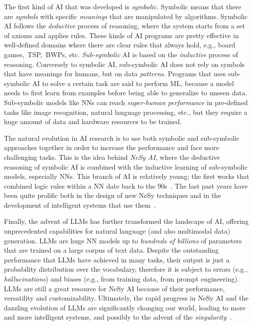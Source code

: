 \begin{refsection}
The first kind of \ac{AI} that was developed is \emph{symbolic}.
%
Symbolic means that there are \emph{symbols} with specific \emph{meanings} that are manipulated by algorithms.
%
Symbolic \ac{AI} follows the \emph{deductive} process of reasoning, where the system starts from a set of axioms and applies rules.
%
These kinds of \ac{AI} programs are pretty effective in well-defined domains where there are clear rules that always hold, e.g., board games,~\ac{TSP},~\acp{BWP}, etc.
%
\emph{Sub-symbolic} \ac{AI} is based on the \emph{inductive} process of reasoning.
%
Conversely to symbolic \ac{AI}, sub-symbolic \ac{AI} does not rely on symbols that have meanings for humans, but on data \emph{patterns}.
%
Programs that uses sub-symbolic \ac{AI} to solve a certain task are said to perform \ac{ML}, because a model needs to first learn from examples before being able to generalize to unseen data.
%
%
Sub-symbolic models like \acp{NN} can reach \emph{super-human performance} in pre-defined tasks like image recognition, natural language processing, etc., but they require a huge amount of data and hardware resources to be trained.


The natural evolution in \ac{AI} research is to use both symbolic and sub-symbolic approaches together in order to increase the performance and face more challenging tasks.
%
This is the idea behind \emph{\ac{NeSy} \ac{AI}}, where the deductive reasoning of symbolic \ac{AI} is combined with the inductive learning of sub-symbolic models, especially \acp{NN}.
%
This branch of \ac{AI} is relatively young; the first works that combined logic rules within a \ac{NN} date back to the 90s~\cite{DBLP:conf/aaai/TowellSN90,DBLP:journals/ai/TowellS94}.
%
The last past years have been quite prolific both in the design of new \ac{NeSy} techniques and in the development of intelligent systems that use them~\cite{DBLP:journals/csur/CiattoSAMO24}.


Finally, the advent of \acp{LLM} has further transformed the landscape of \ac{AI}, offering unprecedented capabilities for natural language (and also multimodal data) generation.
%
\Acp{LLM} are huge \ac{NN} models up to \emph{hundreds of billions} of parameters that are trained on a large corpus of text data.
%
Despite the outstanding performance that \acp{LLM} have achieved in many tasks, their output is just a probability distribution over the vocabulary, therefore it is subject to errors (e.g., \emph{hallucinations}) and biases (e.g., from training data, from prompt engineering).
%
\Acp{LLM} are still a great resource for \ac{NeSy} \ac{AI} because of their performance, versatility and customizability.
%
Ultimately, the rapid progress in \ac{NeSy} \ac{AI} and the dazzling evolution of \acp{LLM} are significantly changing our world, leading to more and more intelligent systems, and possibly to the advent of the \emph{singularity}~\cite{shanahan2015technological}.



\end{refsection}
